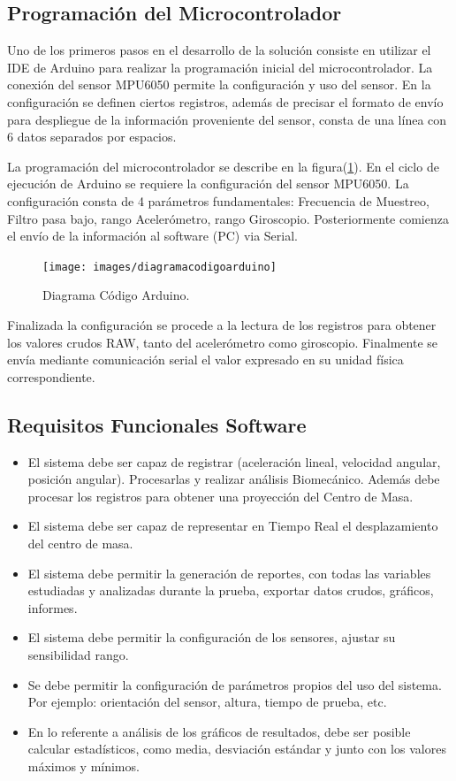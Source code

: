 \documentclass[12pt,a4paper]{article}
\begin{document}
\subsection{Programación del Microcontrolador}
Uno de los primeros pasos en el desarrollo de la solución consiste en utilizar el IDE de Arduino para realizar la programación inicial del microcontrolador. La conexión del sensor MPU6050 permite la configuración y uso del sensor.
En la configuración se definen ciertos registros, además de precisar el formato de envío para despliegue de la información proveniente del sensor, consta de una línea con 6 datos separados por espacios.

La programación del microcontrolador se describe en la figura(\ref{fig:arduinocode}).
En el ciclo de ejecución de Arduino se requiere la configuración del sensor MPU6050. La configuración consta de 4 parámetros fundamentales: Frecuencia de Muestreo, Filtro pasa bajo, rango Acelerómetro, rango Giroscopio. Posteriormente comienza el envío de la información al software (PC) via Serial.

\begin{figure}[H]
	\centering
	\texttt{[image: images/diagramacodigoarduino]}
	\caption{Diagrama Código Arduino.}
	\label{fig:arduinocode}
\end{figure}

Finalizada la configuración se procede a la lectura de los registros para obtener los valores crudos RAW, tanto del acelerómetro como giroscopio. Finalmente se envía mediante comunicación serial el valor expresado en su unidad física correspondiente.

\subsection{Requisitos Funcionales Software}
\begin{itemize}
	\item El sistema debe ser capaz de registrar (aceleración lineal, velocidad angular, posición angular). Procesarlas y realizar análisis Biomecánico. Además debe procesar los registros para obtener una proyección del Centro de Masa.
	\item El sistema debe ser capaz de representar en Tiempo Real el desplazamiento del centro de masa.
	\item El sistema debe permitir la generación de reportes, con todas las variables estudiadas y analizadas durante la prueba, exportar datos crudos, gráficos, informes.
	\item El sistema debe permitir la configuración de los sensores, ajustar su sensibilidad rango.
	\item Se debe permitir la configuración de parámetros propios del uso del sistema. Por ejemplo: orientación del sensor, altura, tiempo de prueba, etc.
	\item En lo referente a análisis de los gráficos de resultados, debe ser posible calcular estadísticos, como media, desviación estándar y junto con los valores máximos y mínimos.
\end{itemize} 
\end{document}

